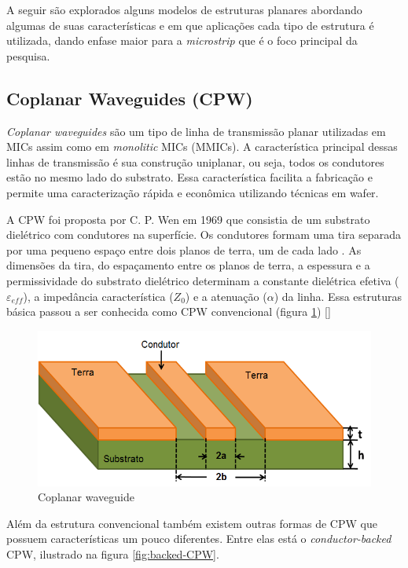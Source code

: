	A seguir são explorados alguns modelos de estruturas planares abordando algumas de suas características e em que aplicações cada tipo de estrutura é utilizada, dando enfase maior para a \textit{microstrip} que é o foco principal da pesquisa.

\subsection{Coplanar Waveguides (CPW)}
	
	\textit{Coplanar waveguides} são um tipo de linha de transmissão planar utilizadas em MICs assim como em \textit{monolitic} MICs (MMICs). A característica principal dessas linhas de transmissão é sua construção uniplanar, ou seja, todos os condutores estão no mesmo lado do substrato. Essa característica facilita a fabricação e permite uma caracterização rápida e econômica utilizando técnicas em wafer.
	
	A CPW foi proposta por C. P. Wen em 1969 que consistia de um substrato dielétrico com condutores na superfície. Os condutores formam uma tira separada por uma pequeno espaço entre dois planos de terra, um de cada lado . As dimensões da tira, do espaçamento entre os planos de terra, a espessura e a permissividade do substrato dielétrico determinam a constante dielétrica efetiva ($\varepsilon_{eff}$), a impedância característica ($Z_0$) e a atenuação ($\alpha$) da linha. Essa estruturas básica passou a ser conhecida como CPW convencional (figura \ref{fig:CPW}) [\cite{Rainee}]

\begin{figure}[htb!]
	\begin{center}
		\includegraphics[scale=.5]{./cap1/figuras/coplanar_waveguide.png}
		\caption{Coplanar waveguide}
		\label{fig:CPW}
	\end{center}
\end{figure}
	
Além da estrutura convencional também existem outras formas de CPW que possuem características um pouco diferentes. Entre elas está o \textit{conductor-backed} CPW, ilustrado na figura \ref{fig:backed-CPW}.

